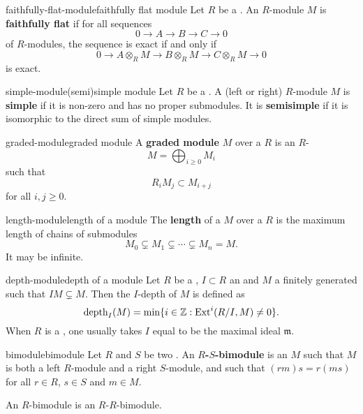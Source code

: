 \begin{topic}{faithfully-flat-module}{faithfully flat module}
    Let $R$ be a . An $R$-module $M$ is \textbf{faithfully flat} if for all sequences
    \[ 0 \to A \to B \to C \to 0 \]
    of $R$-modules, the sequence is exact if and only if
    \[ 0 \to A \otimes_R M \to B \otimes_R M \to C \otimes_R M \to 0 \]
    is exact.
\end{topic}

\begin{topic}{simple-module}{(semi)simple module}
    Let $R$ be a . A (left or right) $R$-module $M$ is \textbf{simple} if it is non-zero and has no proper submodules. It is \textbf{semisimple} if it is isomorphic to the direct sum of simple modules.
\end{topic}

\begin{topic}{graded-module}{graded module}
    A \textbf{graded module} $M$ over a  $R$ is an $R$-
    \[ M = \bigoplus_{i \ge 0} M_i \]
    such that
    \[ R_i M_j \subset M_{i + j} \]
    for all $i, j \ge 0$.
\end{topic}

\begin{topic}{length-module}{length of a module}
    The \textbf{length} of a  $M$ over a  $R$ is the maximum length of chains of submodules
    \[ M_0 \subsetneq M_1 \subsetneq \cdots \subsetneq M_n = M . \]
    It may be infinite.
\end{topic}

\begin{topic}{depth-module}{depth of a module}
    Let $R$ be a , $I \subset R$ an  and $M$ a finitely generated  such that $IM \subsetneq M$. Then the $I$-depth of $M$ is defined as
    \[ \text{depth}_I(M) = \min \{ i \in \mathbb{Z} : \text{Ext}^i(R/I, M) \ne 0 \} . \]
    When $R$ is a , one usually takes $I$ equal to be the maximal ideal $\mathfrak{m}$.
\end{topic}

\begin{topic}{bimodule}{bimodule}
    Let $R$ and $S$ be two . An \textbf{$R$-$S$-bimodule} is an  $M$ such that $M$ is both a left $R$-module and a right $S$-module, and such that $(rm)s = r(ms)$ for all $r \in R$, $s \in S$ and $m \in M$.
    
    An $R$-bimodule is an $R$-$R$-bimodule.
\end{topic}

